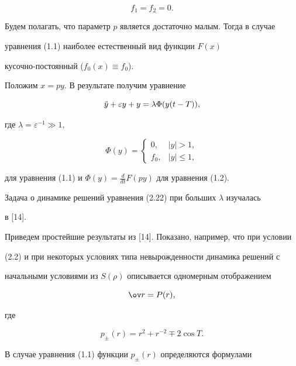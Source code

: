 $$


f_1=f_2=0.


$$


Будем полагать, что параметр $p$ является достаточно малым. Тогда в случае


уравнения (1.1) наиболее естественный вид функции $F(x)$


кусочно-постоянный ($f_0(x)\equiv f_0$).





Положим $x=py$. В результате получим уравнение


\begin{equation}


\Ddot y + \varepsilon y + y = \lambda \Phi(y(t-T)),


\end{equation}


где $\lambda=\varepsilon^{-1} \gg 1$,


$$


\Phi(y)=


\begin{cases}


0, & |y|>1,\\


f_0, & |y|\le 1,


\end{cases}


$$


для уравнения (1.1) и $\Phi(y)=\frac{d}{dt}F(py)$ для уравнения (1.2).


Задача о динамике решений уравнения (2.22) при больших $\lambda$ изучалась


в [14].


Приведем простейшие результаты из [14]. Показано, например, что при условии


(2.2) и при некоторых условиях типа невырожденности динамика решений с


начальными условиями из $S(\rho)$ описывается одномерным отображением


\begin{equation}


\ov r = P(r),


\end{equation}


где


$$


p_{\pm}(r)=r^2+r^{-2}\mp2\cos T.


$$


В случае уравнения (1.1) функции $p_{\pm}(r)$ определяются формулами


